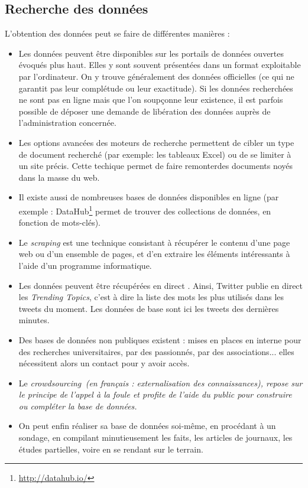 \subsection{Recherche des données}
L'obtention des données peut se faire de différentes manières :
\begin{itemize}
\item Les données peuvent être disponibles sur les portails de données ouvertes évoqués 
plus haut. Elles y sont souvent présentées dans un format exploitable par l'ordinateur. 
On y trouve généralement des données officielles (ce qui ne garantit pas leur 
complétude ou leur exactitude). Si les données recherchées ne sont pas en ligne mais 
que l'on soupçonne leur existence, il est parfois possible de déposer une demande de \og libération des données \fg auprès de l'administration concernée.
\item Les options avancées des moteurs de recherche permettent de cibler un type de 
document recherché (par exemple: les tableaux Excel) ou de se limiter à un site précis. 
Cette techique permet de faire \og remonter\fg des documents noyés dans la masse du web.
\item Il existe aussi de nombreuses bases de données disponibles en ligne (par exemple : DataHub\footnote{\url{http://datahub.io/}} permet de trouver des collections de données, en fonction de mots-clés).
\item Le \textit{scraping} est une technique consistant à récupérer le contenu d'une page web ou d'un ensemble de pages, et d'en extraire les éléments intéressants à 
l'aide d'un programme informatique.
\item Les données peuvent être récupérées en direct \cite{bradshaw}. Ainsi, Twitter publie en direct les \textit{Trending Topics}, c'est à dire la liste des mots les plus utilisés
dans les tweets du moment. Les données de base sont ici les tweets des dernières minutes.
\item Des bases de données non publiques existent : mises en places en interne pour des recherches universitaires, par des passionnés, par des associations... elles nécessitent alors un contact pour y avoir accès.
\item Le \em crowdsourcing\em\, (en français : externalisation des connaissances), repose sur le principe de \og l'appel à la foule \fg et profite de l'aide du public pour
construire ou compléter la base de données.
\item On peut enfin réaliser sa base de données soi-même, en procédant à un sondage, en compilant minutieusement
les faits, les articles de journaux, les études partielles, voire en se rendant sur le terrain.
\end{itemize}

